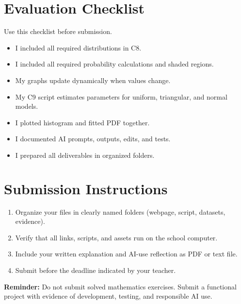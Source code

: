 	\section{Evaluation Checklist}
	Use this checklist before submission.
	\begin{itemize}
		\item[\(\square\)] I included all required distributions in C8.
		\item[\(\square\)] I included all required probability calculations and shaded regions.
		\item[\(\square\)] My graphs update dynamically when values change.
		\item[\(\square\)] My C9 script estimates parameters for uniform, triangular, and normal models.
		\item[\(\square\)] I plotted histogram and fitted PDF together.
		\item[\(\square\)] I documented AI prompts, outputs, edits, and tests.
		\item[\(\square\)] I prepared all deliverables in organized folders.
	\end{itemize}

	\section{Submission Instructions}
	\begin{enumerate}
		\item Organize your files in clearly named folders (webpage, script, datasets, evidence).
		\item Verify that all links, scripts, and assets run on the school computer.
		\item Include your written explanation and AI-use reflection as PDF or text file.
		\item Submit before the deadline indicated by your teacher.
	\end{enumerate}
	
	\vspace{0.2cm}
	\textbf{Reminder:} Do not submit solved mathematics exercises. Submit a functional project with evidence of development, testing, and responsible AI use.


